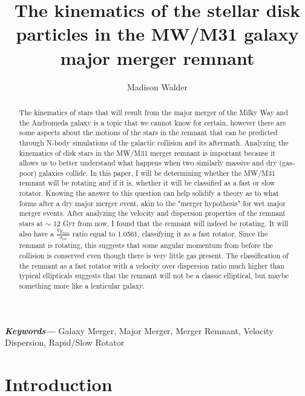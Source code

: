 \documentclass[twocolumn]{aastex63}
\providecommand{\keywords}[1]
{
  \small	
  \textbf{\textit{Keywords---}} #1
}
\begin{document}
\title{The kinematics of the stellar disk particles in the MW/M31 galaxy major merger remnant}

\keywords{Galaxy Merger, Major Merger, Merger Remnant, Velocity Dispersion, Rapid/Slow Rotator}





\author{Madison Walder}



\begin{abstract}
    The kinematics of stars that will result from the major merger of the Milky Way and the Andromeda galaxy is a topic that we cannot know for certain, however there are some aspects about the motions of the stars in the remnant that can be predicted through N-body simulations of the galactic collision and its aftermath.  Analyzing the kinematics of disk stars in the MW/M31 merger remnant is important because it allows us to better understand what happens when two similarly massive and dry (gas-poor) galaxies collide.  In this paper, I will be determining whether the MW/M31 remnant will be rotating and if it is, whether it will be classified as a fast or slow rotator.  Knowing the answer to this question can help solidify a theory as to what forms after a dry major merger event, akin to the "merger hypothesis" for wet major merger events.  After analyzing the velocity and dispersion properties of the remnant stars at $\sim$ 12 Gyr from now, I found that the remnant will indeed be rotating.  It will also have a \(\frac{Vy_{max}}{\sigma_{tot}}\) ratio equal to 1.0561, classifying it as a fast rotator.  Since the remnant is rotating, this suggests that some angular momentum from before the collision is conserved even though there is very little gas present.  The classification of the remnant as a fast rotator with a velocity over dispersion ratio much higher than typical ellipticals suggests that the remnant will not be a classic elliptical, but maybe something more like a lenticular galaxy.                
\end{abstract}
\section{Introduction} \label{sec:intro}
\end{document}
